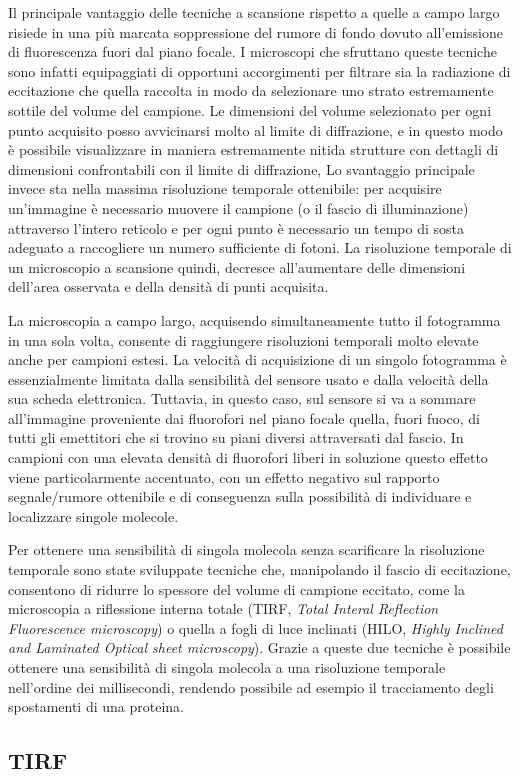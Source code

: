 Il principale vantaggio delle tecniche a scansione rispetto a quelle
a campo largo risiede in una più marcata soppressione del
rumore di fondo dovuto all'emissione di fluorescenza fuori dal
piano focale. I microscopi che sfruttano queste tecniche sono infatti
equipaggiati di opportuni accorgimenti per filtrare sia la radiazione
di eccitazione che quella raccolta in modo da selezionare uno strato
estremamente sottile del volume del campione.
Le dimensioni del volume selezionato per ogni
punto acquisito posso avvicinarsi molto al limite di diffrazione, e
in questo modo è possibile visualizzare in maniera estremamente nitida
strutture con dettagli di dimensioni confrontabili con il limite
di diffrazione,
Lo svantaggio principale invece sta nella massima risoluzione
temporale ottenibile: per acquisire un'immagine è necessario
muovere il campione (o il fascio di illuminazione) attraverso
l'intero reticolo e per ogni punto è necessario un tempo di sosta
adeguato a raccogliere un numero sufficiente di fotoni.
La risoluzione temporale di un microscopio a scansione quindi,
decresce all'aumentare delle dimensioni dell'area osservata e della
densità di punti acquisita.

La microscopia a campo largo, acquisendo simultaneamente tutto il
fotogramma in una sola volta, consente di raggiungere risoluzioni
temporali molto elevate anche per campioni estesi. La velocità
di acquisizione di un singolo fotogramma è essenzialmente limitata
dalla sensibilità del sensore usato e dalla velocità della sua scheda
elettronica.
Tuttavia, in questo caso, sul sensore si va a sommare all'immagine
proveniente dai fluorofori nel piano focale quella, fuori fuoco,
di tutti gli emettitori che si trovino su piani diversi attraversati
dal fascio.
In campioni con una elevata densità di fluorofori liberi in soluzione
questo effetto viene particolarmente accentuato, con un effetto
negativo sul rapporto segnale/rumore ottenibile e di conseguenza
sulla possibilità di individuare e localizzare singole molecole.

Per ottenere una sensibilità di singola molecola senza scarificare
la risoluzione temporale sono state sviluppate tecniche che,
manipolando il fascio di eccitazione, consentono di ridurre lo
spessore del volume di campione eccitato, come la microscopia a
riflessione interna totale
(TIRF, \textit{Total Interal Reflection Fluorescence microscopy})
o quella a fogli di luce inclinati
(HILO, \textit{Highly Inclined and Laminated Optical sheet
microscopy}).
Grazie a queste due tecniche è possibile ottenere una sensibilità
di singola molecola a una risoluzione temporale nell'ordine dei
millisecondi, rendendo possibile ad esempio il tracciamento
degli spostamenti di una proteina.

\subsection{TIRF}


